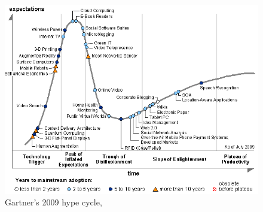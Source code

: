 \medskip
\begin{figure}[H] 
  \begin{center}
    \includegraphics[width=\textwidth]{grafik/gartner-hype-cycle-2009} 
  \end{center}
  \caption{Gartner's 2009 hype cycle, \cite{cloud:hypecycle}}
\end{figure}


